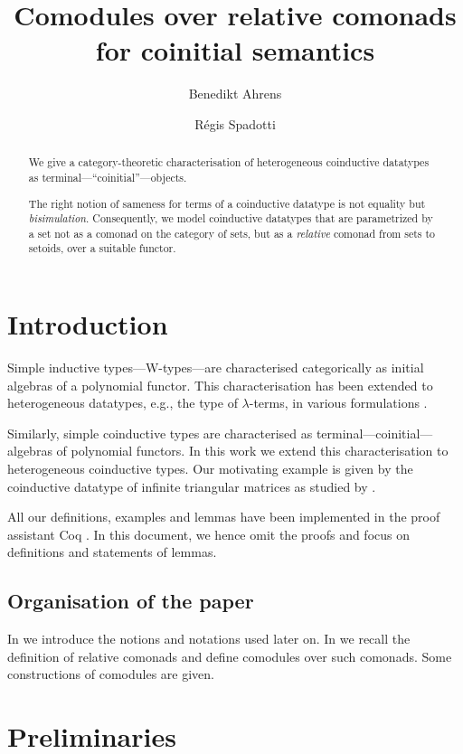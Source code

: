 \documentclass{amsart}
\author{Benedikt Ahrens}
\author{R\'egis Spadotti}
\title[Comodules over relative comonads for coinitial semantics]{Comodules over relative comonads \\ for coinitial semantics}
\begin{document}
\begin{abstract}
  We give a category-theoretic characterisation of heterogeneous coinductive datatypes as terminal---\enquote{coinitial}---objects.
  
  The right notion of sameness for terms of a coinductive datatype is not equality but \emph{bisimulation}.
  Consequently, we model coinductive datatypes that are parametrized by a set not as a comonad on the category of sets,
  but as a \emph{relative} comonad from sets to setoids, over a suitable functor.
\end{abstract}

\maketitle


\section{Introduction}

 Simple inductive types---\textsf{W}-types---are characterised categorically as initial algebras of
 a polynomial functor.
 This characterisation has been extended to heterogeneous datatypes, e.g., the type of $\lambda$-terms,
 in various formulations \parencite{fpt, ahrens_relmonads}.
 
 Similarly, simple coinductive types are characterised as terminal---coinitial---algebras of polynomial functors.
 In this work we extend this characterisation to heterogeneous coinductive types.
 Our motivating example is given by the coinductive datatype of infinite triangular matrices as studied by
 \textcite{DBLP:conf/types/MatthesP11}.

 All our definitions, examples and lemmas have been implemented in the proof assistant \textsf{Coq} \parencite{coq}.
 In this document, we hence omit the proofs and focus on definitions and statements of lemmas.
 
\subsection*{Organisation of the paper}
  In  we introduce the notions and notations used later on.
  In  we recall the definition of relative comonads and define comodules over such comonads.
  Some constructions of comodules are given.
 
\section{Preliminaries}\label{sec:preliminaries}
\end{document}
